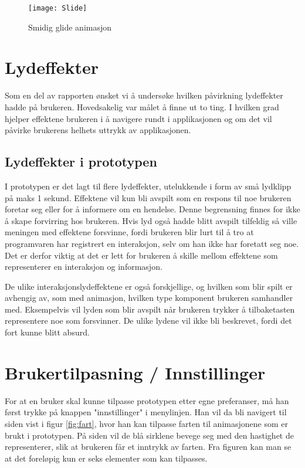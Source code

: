 \begin{figure}
\centering
\texttt{[image: Slide]}
\caption{Smidig glide animasjon}
\label{fig:navAni}
\end{figure}



\section{Lydeffekter} 
 
Som en del av rapporten ønsket vi å undersøke hvilken påvirkning lydeffekter hadde på brukeren. Hovedsakelig var målet å finne ut to ting. I hvilken grad hjelper effektene brukeren i å navigere rundt i applikasjonen og om det vil påvirke brukerens helhets uttrykk av applikasjonen.
 
 
\subsection{Lydeffekter i prototypen} 
 

I prototypen er det lagt til flere lydeffekter, utelukkende i form av små lydklipp på maks 1 sekund. Effektene vil kun bli avspilt som en respons til noe brukeren foretar seg eller for å informere om en hendelse. Denne begrensning finnes for ikke å skape forvirring hos brukeren. Hvis lyd også hadde blitt avspilt tilfeldig så ville meningen med effektene forsvinne, fordi brukeren blir lurt til å tro at programvaren har registrert en interaksjon, selv om han ikke har foretatt seg noe. Det er derfor viktig at det er lett for brukeren å skille mellom effektene som representerer en interaksjon og informasjon. 

De ulike interaksjonslydeffektene er også forskjellige, og hvilken som blir spilt er avhengig av,  som med animasjon,  hvilken type komponent brukeren samhandler med. Eksempelvis vil lyden som blir avspilt når brukeren trykker å tilbaketasten representere noe som forsvinner. De ulike lydene vil ikke bli beskrevet, fordi det fort kunne blitt absurd. 
 
 
 
\section{Brukertilpasning / Innstillinger}

For at en bruker skal kunne tilpasse prototypen etter egne preferanser, må han først trykke på knappen "innstillinger" i menylinjen. Han vil da bli navigert  til siden vist i figur \ref{fig:fart}, hvor han kan tilpasse farten til animasjonene som er brukt i prototypen. På siden vil de blå sirklene bevege seg med den hastighet de representerer, slik at brukeren får et inntrykk av farten. Fra figuren kan man se at det foreløpig kun er seks elementer som kan tilpasses.


